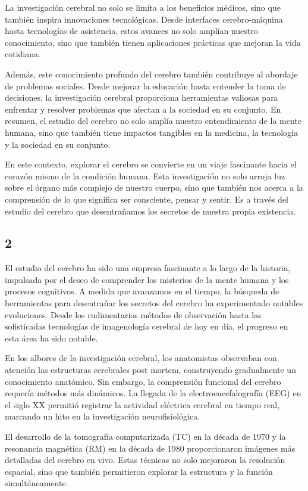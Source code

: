 \documentclass{article}
\begin{document}
	La investigación cerebral no solo se limita a los beneficios médicos, sino que también inspira innovaciones tecnológicas. Desde interfaces cerebro-máquina hasta tecnologías de asistencia, estos avances no solo amplían nuestro conocimiento, sino que también tienen aplicaciones prácticas que mejoran la vida cotidiana.
	
	Además, este conocimiento profundo del cerebro también contribuye al abordaje de problemas sociales. Desde mejorar la educación hasta entender la toma de decisiones, la investigación cerebral proporciona herramientas valiosas para enfrentar y resolver problemas que afectan a la sociedad en su conjunto. En resumen, el estudio del cerebro no solo amplía nuestro entendimiento de la mente humana, sino que también tiene impactos tangibles en la medicina, la tecnología y la sociedad en su conjunto.
	
	En este contexto, explorar el cerebro se convierte en un viaje fascinante hacia el corazón mismo de la condición humana. Esta investigación no solo arroja luz sobre el órgano más complejo de nuestro cuerpo, sino que también nos acerca a la comprensión de lo que significa ser consciente, pensar y sentir. Es a través del estudio del cerebro que desentrañamos los secretos de nuestra propia existencia.
	
	\subsection{2}
	
	El estudio del cerebro ha sido una empresa fascinante a lo largo de la historia, impulsada por el deseo de comprender los misterios de la mente humana y los procesos cognitivos. A medida que avanzamos en el tiempo, la búsqueda de herramientas para desentrañar los secretos del cerebro ha experimentado notables evoluciones. Desde los rudimentarios métodos de observación hasta las sofisticadas tecnologías de imagenología cerebral de hoy en día, el progreso en esta área ha sido notable.
	
	En los albores de la investigación cerebral, los anatomistas observaban con atención las estructuras cerebrales post mortem, construyendo gradualmente un conocimiento anatómico. Sin embargo, la comprensión funcional del cerebro requería métodos más dinámicos. La llegada de la electroencefalografía (EEG) en el siglo XX permitió registrar la actividad eléctrica cerebral en tiempo real, marcando un hito en la investigación neurofisiológica.
	
	El desarrollo de la tomografía computarizada (TC) en la década de 1970 y la resonancia magnética (RM) en la década de 1980 proporcionaron imágenes más detalladas del cerebro en vivo. Estas técnicas no solo mejoraron la resolución espacial, sino que también permitieron explorar la estructura y la función simultáneamente.
	
\end{document}
